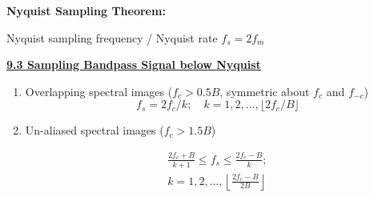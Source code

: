 \documentclass[landscape,a4paper]{extarticle}
\newenvironment{Figure}
  {\noindent\minipage{\linewidth}}
  {\endminipage\par\medskip}
\begin{document}
\begin{multicols*}{5}




    \textbf{Nyquist Sampling Theorem:}

    Nyquist sampling frequency / Nyquist rate $f_s = 2 f_m$

    \textbf{\uline{9.3 Sampling Bandpass Signal below Nyquist}}

    \begin{enumerate}[label=(\alph*)]
        \item Overlapping spectral images ($f_c > 0.5B$, symmetric about $f_c$ and $f_{-c}$)
        \[
            f_s = 2f_c / k; \quad k = 1,2,\ldots, \lfloor 2f_c/B \rfloor \tag{9.2a}
        \]
        \item Un-aliased spectral images ($f_c > 1.5B$)

        \[
            \begin{split}
                \frac{2f_c + B}{k + 1} \leq f_s \leq \frac{2f_c - B}{k};\\
                k = 1,2,\ldots,\left\lfloor \frac{2f_c - B}{2B} \right\rfloor
            \end{split} \tag{9.2b}
        \]
    \end{enumerate}
\end{multicols*}
\end{document}

